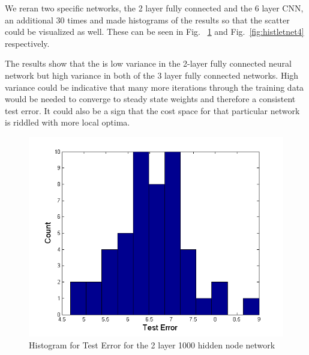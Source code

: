 \documentclass[12pt, twocolumn]{article}
\begin{document}
We reran two specific networks, the 2 layer fully connected and the 6 layer CNN, an additional 30 times and made histograms of the results so that the scatter could be visualized as well. These can be seen in Fig. ~\ref{fig:hist2layer} and Fig.~\ref{fig:histletnet4} respectively. 





The results show that the is low variance in the 2-layer fully connected neural network but high variance in both of the 3 layer fully connected networks. High variance could be indicative that many more iterations through the training data would be needed to converge to steady state weights and therefore a consistent test error. It could also be a sign that the cost space for that particular network is riddled with more local optima.  


\begin{figure}
\includegraphics[scale=.5]{hist2layer.png}
\caption{Histogram for Test Error for the 2 layer 1000 hidden node network}
\label{fig:hist2layer}
\end{figure}
\end{document}
